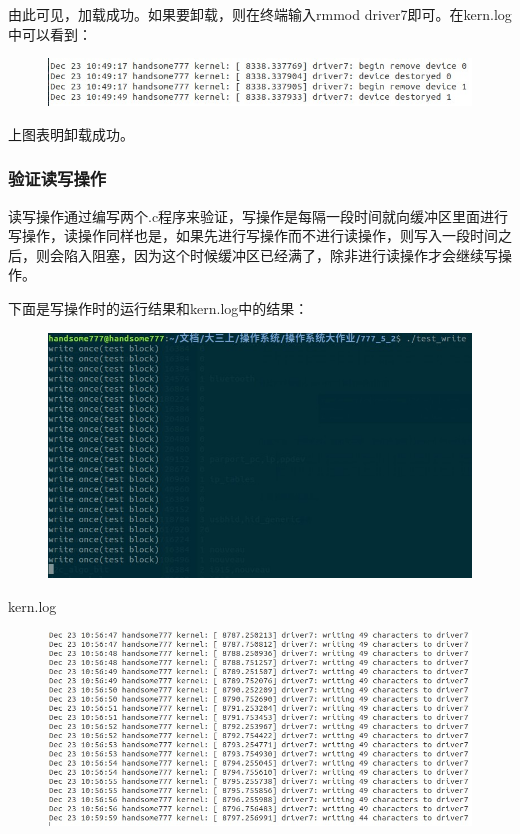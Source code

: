 \documentclass[UTF8]{ctexart}
\begin{document}
由此可见，加载成功。如果要卸载，则在终端输入rmmod driver7即可。在kern.log中可以看到：\par
\begin{figure}[!h]
\centering
\includegraphics[scale = 0.7,bb=0 0 534 60]{5_6.jpg}
\label{img10}
\end{figure}
上图表明卸载成功。

\subsubsection{验证读写操作}
读写操作通过编写两个.c程序来验证，写操作是每隔一段时间就向缓冲区里面进行写操作，读操作同样也是，如果先进行写操作而不进行读操作，则写入一段时间之后，则会陷入阻塞，因为这个时候缓冲区已经满了，除非进行读操作才会继续写操作。\par
下面是写操作时的运行结果和kern.log中的结果：\par
\begin{figure}[!h]
\centering
\includegraphics[scale = 0.7,bb=0 0 546 316]{5_7.jpg}
\label{img10}
\end{figure}
kern.log\par
\begin{figure}[!h]
\centering
\includegraphics[scale = 0.7,bb=0 0 603 278]{5_8.jpg}
\label{img11}
\end{figure}
\end{document}
